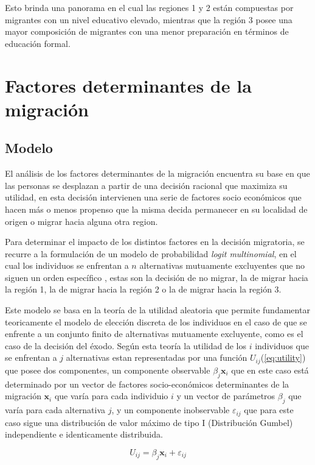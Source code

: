 \documentclass[12pt,a4paper]{article}
\begin{document}
Esto brinda una panorama en el cual las regiones 1 y 2 están compuestas por migrantes con un nivel educativo elevado, mientras que la región 3 posee una mayor composición de migrantes con una menor preparación en términos de educación formal.


\newpage
\section{Factores determinantes de la migración}
\subsection{Modelo}
El análisis de los factores determinantes de la migración  encuentra su base en que las personas se desplazan a partir de una decisión racional que maximiza su utilidad, en esta decisión intervienen una serie de factores socio económicos que hacen más o menos propenso que la misma decida permanecer en su localidad de origen o migrar hacia alguna otra region.

Para determinar el impacto de los distintos factores en la decisión migratoria, se recurre a la formulación de un modelo de probabilidad \textit{logit multinomial}, en el cual los individuos se enfrentan a $n$ alternativas mutuamente excluyentes que no siguen un orden específico \parencite{greene_econometric_2018}, estas son la decisión de no migrar, la de migrar hacia la región 1, la de migrar hacia la región 2 o la de migrar hacia la región 3.

Este modelo se basa en la teoría de la utilidad aleatoria \parencite{domencich_urban_1975} que permite fundamentar teoricamente el modelo de elección discreta de los individuos en el caso de que se enfrente a un conjunto finito de alternativas mutuamente excluyente, como es el caso de la decisión del éxodo.
Según esta teoría la utilidad de los $i$ individuos que se enfrentan a $j$ alternativas estan representadas por una función $U_{ij}$(\ref{eq:utility}) que posee dos componentes, un componente observable $\beta_{j} \textbf{x}_{i}$  que en este caso está determinado por un vector de factores socio-económicos determinantes de la migración $\textbf{x}_{i}$ que varía para cada individuio $i$ y un vector de parámetros $\beta_{j}$ que varía para cada alternativa $j$, y un componente inobservable $\varepsilon_{ij}$ que para este caso sigue una distribución de valor máximo de tipo I (Distribución Gumbel) independiente e identicamente distribuida.
\begin {center}
\begin{equation}\label{eq:utility}
U_{ij}=\beta_{j} \textbf{x}_{i}+\varepsilon_{ij}
\end{equation}
\end {center}
\end{document}
